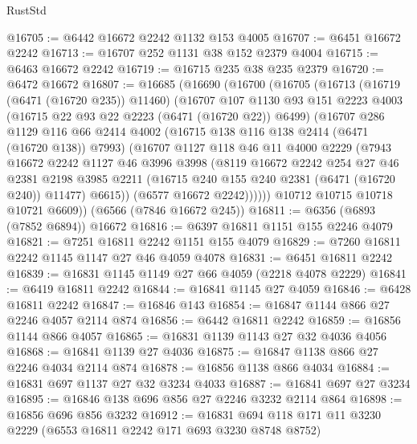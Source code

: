 \begin{lexlean}{RustStd}
\begin{coremodule}
{\begin{coremodule}
{{{{{{{{{{{{{{{{{{{{{{{{{{@16705 := @6442 @16672 @2242 @1132 @153 @4005
@16707 := @6451 @16672 @2242
@16713 := @16707 @252 @1131 @38 @152 @2379 @4004
@16715 := @6463 @16672 @2242
@16719 := @16715 @235 @38 @235 @2379
@16720 := @6472 @16672
@16807 := @16685
    (@16690
      (@16700
        (@16705
          (@16713
            (@16719 (@6471 (@16720 @235)) @11460)
            (@16707
              @107
              @1130
              @93
              @151
              @2223
              @4003
              (@16715 @22 @93 @22 @2223 (@6471 (@16720 @22)) @6499)
              (@16707
                @286
                @1129
                @116
                @66
                @2414
                @4002
                (@16715 @138 @116 @138 @2414 (@6471 (@16720 @138)) @7993)
                (@16707
                  @1127
                  @118
                  @46
                  @11
                  @4000
                  @2229
                  (@7943
                    @16672
                    @2242
                    @1127
                    @46
                    @3996
                    @3998
                    (@8119
                      @16672
                      @2242
                      @254
                      @27
                      @46
                      @2381
                      @2198
                      @3985
                      @2211
                      (@16715 @240 @155 @240 @2381 (@6471 (@16720 @240)) @11477)
                      @6615))
                  (@6577 @16672 @2242))))))
        @10712
        @10715
        @10718
        @10721
        @6609))
    (@6566 (@7846 @16672 @245))
@16811 := @6356 (@6893 (@7852 @6894)) @16672
@16816 := @6397 @16811 @1151 @155 @2246 @4079
@16821 := @7251 @16811 @2242 @1151 @155 @4079
@16829 := @7260 @16811 @2242 @1145 @1147 @27 @46 @4059 @4078
@16831 := @6451 @16811 @2242
@16839 := @16831 @1145 @1149 @27 @66 @4059 (@2218 @4078 @2229)
@16841 := @6419 @16811 @2242
@16844 := @16841 @1145 @27 @4059
@16846 := @6428 @16811 @2242
@16847 := @16846 @143
@16854 := @16847 @1144 @866 @27 @2246 @4057 @2114 @874
@16856 := @6442 @16811 @2242
@16859 := @16856 @1144 @866 @4057
@16865 := @16831 @1139 @1143 @27 @32 @4036 @4056
@16868 := @16841 @1139 @27 @4036
@16875 := @16847 @1138 @866 @27 @2246 @4034 @2114 @874
@16878 := @16856 @1138 @866 @4034
@16884 := @16831 @697 @1137 @27 @32 @3234 @4033
@16887 := @16841 @697 @27 @3234
@16895 := @16846 @138 @696 @856 @27 @2246 @3232 @2114 @864
@16898 := @16856 @696 @856 @3232
@16912 := @16831 @694 @118 @171 @11 @3230 @2229 (@6553 @16811 @2242 @171 @693 @3230 @8748 @8752)
}}}}}}}}}}}}}}}}}}}}}}}}}}
\end{coremodule}}
\end{coremodule}
\end{lexlean}
